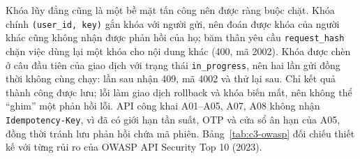 Khóa lũy đẳng cũng là một bề mặt tấn công nên được ràng buộc chặt. Khóa chính \texttt{(user\_id, key)} gắn khóa với người gửi, nên đoán được khóa của người khác cũng không nhận được phản hồi của họ; băm thân yêu cầu \texttt{request\_hash} chặn việc dùng lại một khóa cho nội dung khác (400, mã 2002). Khóa được chèn ở câu đầu tiên của giao dịch với trạng thái \texttt{in\_progress}, nên hai lần gửi đồng thời không cùng chạy: lần sau nhận 409, mã 4002 và thử lại sau. Chỉ kết quả thành công được lưu; lỗi làm giao dịch rollback và khóa biến mất, nên không thể “ghim” một phản hồi lỗi. API công khai A01--A05, A07, A08 không nhận \texttt{Idempotency-Key}, vì đã có giới hạn tần suất, OTP và cửa sổ ân hạn của A05, đồng thời tránh lưu phản hồi chứa mã phiên. Bảng~\ref{tab:c3-owasp} đối chiếu thiết kế với từng rủi ro của OWASP API Security Top 10 (2023).

